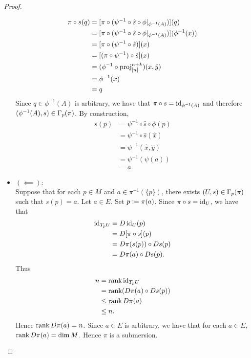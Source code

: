 \documentclass{book}
\begin{document}
\begin{proof}
\begin{itemize}
			\begin{align*}
				\pi \circ s (q)
				& = [\pi \circ (\psi^{-1} \circ \hat{s} \circ \phi|_{\phi^{-1}(A)})] (q) \\
				& = [\pi \circ (\psi^{-1} \circ \hat{s} \circ \phi|_{\phi^{-1}(A)})] (\phi^{-1}(x)) \\
				& = [\pi \circ (\psi^{-1} \circ \hat{s})] (x) \\
				& = [(\pi \circ \psi^{-1}) \circ \hat{s}] (x) \\
				& = (\phi^{-1} \circ \operatorname{\text{proj}}^{n+k}_{[n]}) (x, \hat{y}) \\
				& = \phi^{-1}(x) \\
				& = q
			\end{align*}
			Since $q \in \phi^{-1}(A)$ is arbitrary, we have that $\pi \circ s = \operatorname{id}_{\phi^{-1}(A)}$ and therefore $(\phi^{-1}(A), s) \in \Gamma_{p}(\pi)$. By construction, 
			\begin{align*}
				s(p)
				 & = \psi^{-1} \circ \hat{s} \circ \phi(p) \\
				 & = \psi^{-1} \circ \hat{s}(\hat{x}) \\
				 & = \psi^{-1}(\hat{x}, \hat{y}) \\
				 & = \psi^{-1}(\psi(a)) \\
				 & = a.
			\end{align*}
			\item $(\impliedby):$ \\
			Suppose that for each $p \in M$ and $a \in \pi^{-1}(\{p\})$, there exists $(U, s) \in \Gamma_p(\pi)$ such that $s(p) = a$. Let $a \in E$. Set $p \vcentcolon= \pi(a)$. Since $\pi \circ s = \operatorname{id}_U$, we have that 
			\begin{align*}
				\operatorname{id}_{T_pU}
				& = D \operatorname{id}_U (p) \\
				& = D[ \pi \circ s](p) \\
				& = D\pi(s(p)) \circ D s(p) \\
				& = D \pi(a) \circ D s(p).
			\end{align*}
			Thus 
			\begin{align*}
				n
				& = \operatorname{\text{rank}} \operatorname{id}_{T_pU} \\
				& = \operatorname{\text{rank}} (D \pi(a) \circ D s(p)) \\
				& \leq \operatorname{\text{rank}} D \pi(a) \\
				& \leq n.
			\end{align*}
			Hence $\operatorname{\text{rank}} D \pi(a) = n$. Since $a \in E$ is arbitrary, we have that for each $a \in E$, $\operatorname{\text{rank}} D \pi(a) = \dim M$. Hence $\pi$ is a submersion. 
		\end{itemize}
	\end{proof}
\end{document}
